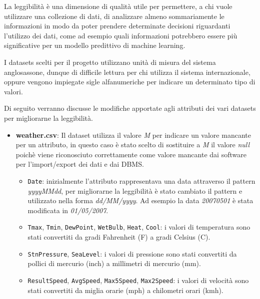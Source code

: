 La leggibilità è una dimensione di qualità utile per permettere, a chi vuole 
utilizzare una collezione di dati, di analizzare almeno sommariamente le 
informazioni in modo da poter prendere determinate decisioni riguardanti 
l'utilizzo dei dati, come ad esempio quali informazioni potrebbero essere più 
significative per un modello predittivo di machine learning.

I datasets scelti per il progetto utilizzano unità di misura del 
sistema anglosassone, dunque di difficile lettura per chi utilizza il sistema 
internazionale, oppure vengono impiegate sigle alfanumeriche per indicare 
un determinato tipo di valori. 

Di seguito verranno discusse le modifiche 
apportate agli attributi dei vari datasets per migliorarne la leggibilità.

\begin{itemize}

    \item \textbf{weather.csv}: Il dataset utilizza il valore \textit{M} per 
        indicare un valore mancante per un attributo, in questo caso è stato 
        scelto di sostituire a \textit{M} il valore \textit{null} poichè viene 
        riconosciuto correttamente come valore mancante dai software per 
        l'import/export dei dati e dai DBMS.
        
        \begin{itemize}
            
            \item \texttt{Date}: inizialmente l'attributo rappresentava una 
                data attraverso il pattern \textit{yyyyMMdd}, per migliorarne 
                la leggibilità è stato cambiato il pattern e utilizzato nella 
                forma \textit{dd/MM/yyyy}. Ad esempio la data 
                \textit{20070501} è stata modificata in \textit{01/05/2007}.
        
            \item \texttt{Tmax}, \texttt{Tmin}, \texttt{DewPoint}, 
                \texttt{WetBulb}, \texttt{Heat}, \texttt{Cool}: i valori di 
                temperatura sono stati convertiti da gradi Fahrenheit (F) 
                a gradi Celsius (C).

            \item \texttt{StnPressure}, \texttt{SeaLevel}: i valori di 
                pressione sono stati convertiti da pollici di mercurio (inch) a 
                millimetri di mercurio (mm).

            \item \texttt{ResultSpeed}, \texttt{AvgSpeed}, \texttt{Max5Speed}, 
                \texttt{Max2Speed}: i valori di velocità sono stati convertiti 
                da miglia orarie (mph) a chilometri orari (kmh).

        \end{itemize}
    
\end{itemize}
